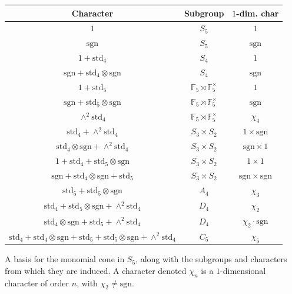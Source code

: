 \documentclass[12pt]{amsart}
\theoremstyle{definition} \newtheorem{definition}[theorem]{Definition}
\theoremstyle{example} \newtheorem{example}[theorem]{Example}
\theoremstyle{remark} \newtheorem{remark}{Remark}[theorem]
\numberwithin{equation}{section}
\numberwithin{theorem}{section}
\newcommand{\sgn}{\mathrm{sgn}}
\newcommand{\std}{\mathrm{std}}
\begin{document}
	{\tiny
	\begin{table}[h]
		\begin{tabular}{|c|c|c|}
			\hline
			Character & Subgroup & $1$-dim. char \\ \hline
			$1$ & $S_5$ & $1$ \\
			$\sgn$ & $S_5$ & $\sgn$ \\
			$1+\std_4$ & $S_4$ & $1$  \\
			$\sgn + \std_4 \otimes \sgn$ & $S_4$ & $\sgn$ \\
			$1+\std_5$ & $\mathbb{F}_5 \rtimes \mathbb{F}_5^\times$ & $1$ \\
			$\sgn + \std_5\otimes \sgn$ & $\mathbb{F}_5 \rtimes \mathbb{F}_5^\times$ & $\sgn$ \\
			$\wedge^2 \std_4$ & $\mathbb{F}_5 \rtimes \mathbb{F}_5^\times$ & $\chi_4$ \\
			$\std_4 + \wedge^2 \std_4$ & $S_3 \times S_2$ & $1 \times \sgn$ \\
			$\std_4\otimes \sgn + \wedge^2\std_4$ & $S_3 \times S_2$ & $\sgn \times 1$ \\
			$1 + \std_4 + \std_5\otimes\sgn$ & $S_3 \times S_2$ & $1 \times 1$ \\
			$\sgn + \std_4\otimes\sgn + \std_5$ & $S_3 \times S_2$ & $\sgn \times \sgn$ \\
			$\std_5 + \std_5\otimes\sgn$ & $A_4$ & $\chi_3$ \\
			$\std_4 + \std_5\otimes\sgn + \wedge^2\std_4$ & $D_4$ & $\chi_2$ \\
			$\std_4\otimes\sgn + \std_5 + \wedge^2\std_4$ & $D_4$ & $\chi_2 \cdot \sgn$ \\
			$\std_4 + \std_4\otimes\sgn + \std_5 + \std_5\otimes\sgn + \wedge^2\std_4$ & $C_5$ & $\chi_5$ \\
			\hline
		\end{tabular}
		\begin{caption}{\label{tbl:S5-monomial-basis}A basis for the monomial cone in $S_5$, along with the subgroups and characters from which they are induced.  A character denoted $\chi_n$ is a $1$-dimensional character of order $n$, with $\chi_2 \ne \sgn$.}\end{caption}
	\end{table}}
	
\end{document}
